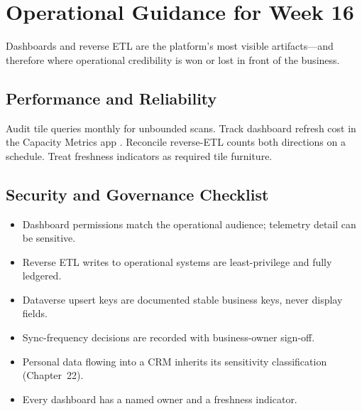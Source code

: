 \section{Operational Guidance for Week 16}
Dashboards and reverse ETL are the platform's most visible artifacts---and therefore where operational credibility is won or lost in front of the business.

\subsection{Performance and Reliability}
Audit tile queries monthly for unbounded scans. Track dashboard refresh cost in the Capacity Metrics app \cite{microsoftFabricMetricsApp}. Reconcile reverse-ETL counts both directions on a schedule. Treat freshness indicators as required tile furniture.

\subsection{Security and Governance Checklist}
\begin{itemize}
    \item Dashboard permissions match the operational audience; telemetry detail can be sensitive.
    \item Reverse ETL writes to operational systems are least-privilege and fully ledgered.
    \item Dataverse upsert keys are documented stable business keys, never display fields.
    \item Sync-frequency decisions are recorded with business-owner sign-off.
    \item Personal data flowing into a CRM inherits its sensitivity classification (Chapter~22).
    \item Every dashboard has a named owner and a freshness indicator.
\end{itemize}

